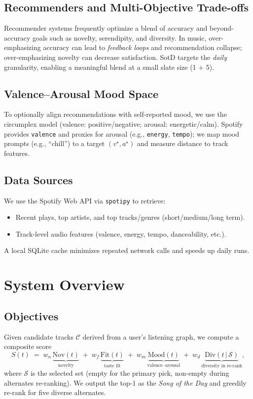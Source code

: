 \documentclass[11pt]{article}
\begin{document}
\subsection{Recommenders and Multi-Objective Trade-offs}
Recommender systems frequently optimize a blend of accuracy and beyond-accuracy goals such as novelty, serendipity, and diversity. In music, over-emphasizing accuracy can lead to \emph{feedback loops} and recommendation collapse; over-emphasizing novelty can decrease satisfaction. SotD targets the \emph{daily} granularity, enabling a meaningful blend at a small slate size (1 $+$ 5).

\subsection{Valence--Arousal Mood Space}
To optionally align recommendations with self-reported mood, we use the circumplex model (valence: positive/negative; arousal: energetic/calm). Spotify provides \texttt{valence} and proxies for arousal (e.g., \texttt{energy}, \texttt{tempo}); we map mood prompts (e.g., ``chill'') to a target $(v^\star, a^\star)$ and measure distance to track features.

\subsection{Data Sources}
We use the Spotify Web API via \texttt{spotipy} to retrieve:
\begin{itemize}[leftmargin=*]
  \item Recent plays, top artists, and top tracks/genres (short/medium/long term).
  \item Track-level audio features (valence, energy, tempo, danceability, etc.).
\end{itemize}
A local SQLite cache minimizes repeated network calls and speeds up daily runs.

\section{System Overview}
\subsection{Objectives}
Given candidate tracks $\mathcal{C}$ derived from a user's listening graph, we compute a composite score
\begin{equation}
S(t) \;=\; w_n \,\underbrace{\mathrm{Nov}(t)}_{\text{novelty}} \;+\; w_f \,\underbrace{\mathrm{Fit}(t)}_{\text{taste fit}} \;+\; w_m \,\underbrace{\mathrm{Mood}(t)}_{\text{valence--arousal}} \;+\; w_d \,\underbrace{\mathrm{Div}(t\,|\,\mathcal{S})}_{\text{diversity in re-rank}},
\label{eq:score}
\end{equation}
where $\mathcal{S}$ is the selected set (empty for the primary pick, non-empty during alternates re-ranking). We output the top-1 as the \emph{Song of the Day} and greedily re-rank for five diverse alternates.
\end{document}
